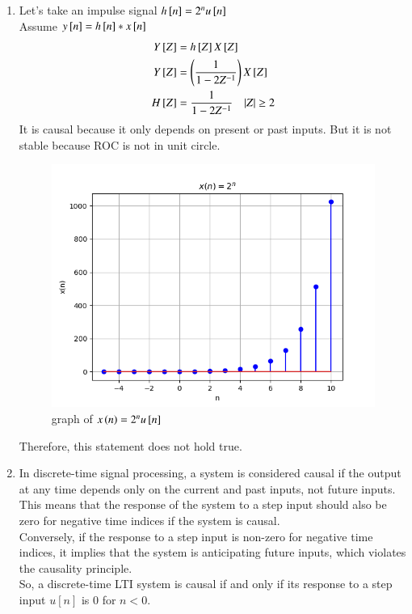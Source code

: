 \documentclass[journal,12pt,twocolumn]{IEEEtran}
\theoremstyle{remark}
\begin{document}
\begin{enumerate}
    \item Let's take an impulse signal $h{}\left[n\right]=2^nu{}\left[n\right]$\\
    Assume $y{}\left[n\right]=h{}\left[n\right]*x{}\left[n\right]$
    \begin{align}
        Y{}\left[Z\right]&=h{}\left[Z\right] X{}\left[Z\right]\\
        Y{}\left[Z\right]&=\left(\frac{1}{1-2Z^{-1}}\right)X{}\left[Z\right]\\
        H{}\left[Z\right]&=\frac{1}{1-2Z^{-1}}\quad     |Z|\geq 2
    \end{align}
    It is causal because it only depends on present or past inputs. But it is not stable because ROC is not in unit circle.
    
    \begin{figure}[ht]
    \renewcommand\thefigure{1}
        \centering
        \includegraphics[width=0.8\linewidth]{figs/graph31.png}
        \caption{graph of $x\left(n\right) = 2^nu{}\left[n\right]$}
    \end{figure}
    Therefore, this statement does not hold true.
    \item In discrete-time signal processing, a system is considered causal if the output at any time depends only on the current and past inputs, not future inputs. This means that the response of the system to a step input should also be zero for negative time indices if the system is causal.\\
    Conversely, if the response to a step input is non-zero for negative time indices, it implies that the system is anticipating future inputs, which violates the causality principle.\\
    So, a discrete-time LTI system is causal if and only if its response to a step input $u[n]$ is 0 for $n<0$.\\

\end{enumerate}
\end{document}
